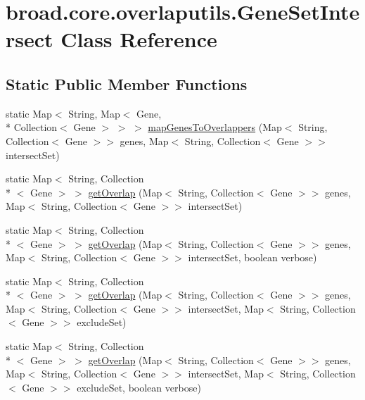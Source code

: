 \hypertarget{classbroad_1_1core_1_1overlaputils_1_1_gene_set_intersect}{\section{broad.\+core.\+overlaputils.\+Gene\+Set\+Intersect Class Reference}
\label{classbroad_1_1core_1_1overlaputils_1_1_gene_set_intersect}
}
\subsection*{Static Public Member Functions}
\begin{DoxyCompactItemize}
\item 
static Map$<$ String, Map$<$ Gene, \\*
Collection$<$ Gene $>$ $>$ $>$ \hyperlink{classbroad_1_1core_1_1overlaputils_1_1_gene_set_intersect_a5d44a2686992401cbd3cf23b0a79f3cb}{map\+Genes\+To\+Overlappers} (Map$<$ String, Collection$<$ Gene $>$$>$ genes, Map$<$ String, Collection$<$ Gene $>$$>$ intersect\+Set)
\item 
static Map$<$ String, Collection\\*
$<$ Gene $>$ $>$ \hyperlink{classbroad_1_1core_1_1overlaputils_1_1_gene_set_intersect_af40f199698b8f8ae56e31ccfb162e5e5}{get\+Overlap} (Map$<$ String, Collection$<$ Gene $>$$>$ genes, Map$<$ String, Collection$<$ Gene $>$$>$ intersect\+Set)
\item 
static Map$<$ String, Collection\\*
$<$ Gene $>$ $>$ \hyperlink{classbroad_1_1core_1_1overlaputils_1_1_gene_set_intersect_aa98d0fc676ae1ac2eb1bd21772eb1ff1}{get\+Overlap} (Map$<$ String, Collection$<$ Gene $>$$>$ genes, Map$<$ String, Collection$<$ Gene $>$$>$ intersect\+Set, boolean verbose)
\item 
static Map$<$ String, Collection\\*
$<$ Gene $>$ $>$ \hyperlink{classbroad_1_1core_1_1overlaputils_1_1_gene_set_intersect_aa1485b48f6a1d47327c251a455046896}{get\+Overlap} (Map$<$ String, Collection$<$ Gene $>$$>$ genes, Map$<$ String, Collection$<$ Gene $>$$>$ intersect\+Set, Map$<$ String, Collection$<$ Gene $>$$>$ exclude\+Set)
\item 
static Map$<$ String, Collection\\*
$<$ Gene $>$ $>$ \hyperlink{classbroad_1_1core_1_1overlaputils_1_1_gene_set_intersect_a769e53d9854cb10aa275735ed22fca37}{get\+Overlap} (Map$<$ String, Collection$<$ Gene $>$$>$ genes, Map$<$ String, Collection$<$ Gene $>$$>$ intersect\+Set, Map$<$ String, Collection$<$ Gene $>$$>$ exclude\+Set, boolean verbose)

\end{DoxyCompactItemize}
